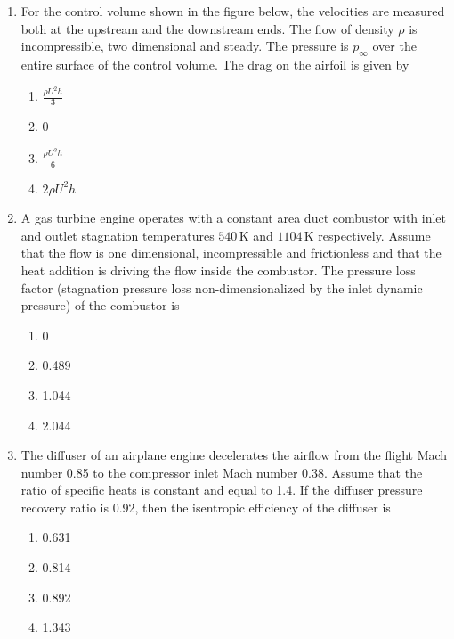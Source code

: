 \documentclass{article}
\begin{document}
\begin{enumerate}
    \item For the control volume shown in the figure below, the velocities are measured both at the upstream and the downstream ends. The flow of density $\rho$ is incompressible, two dimensional and steady. The pressure is $p_\infty$ over the entire surface of the control volume. The drag on the airfoil is given by
    \begin{figure}[H]
        \centering
        
        \caption{}
        \label{}
    \end{figure}
    \begin{enumerate}
        \item $\frac{\rho U^2 h}{3}$
        \item 0
        \item $\frac{\rho U^2 h}{6}$
        \item $2 \rho U^2 h$
    \end{enumerate}

    \item A gas turbine engine operates with a constant area duct combustor with inlet and outlet stagnation temperatures $540 \, \mathrm{K}$ and $1104 \, \mathrm{K}$ respectively. Assume that the flow is one dimensional, incompressible and frictionless and that the heat addition is driving the flow inside the combustor. The pressure loss factor (stagnation pressure loss non-dimensionalized by the inlet dynamic pressure) of the combustor is
    \begin{multicols}{4}
    \begin{enumerate}
        \item 0
        \item 0.489
        \item 1.044
        \item 2.044
    \end{enumerate}
    \end{multicols}
    

    \item The diffuser of an airplane engine decelerates the airflow from the flight Mach number 0.85 to the compressor inlet Mach number 0.38. Assume that the ratio of specific heats is constant and equal to 1.4. If the diffuser pressure recovery ratio is 0.92, then the isentropic efficiency of the diffuser is
    \begin{multicols}{4}
    \begin{enumerate}
        \item 0.631
        \item 0.814
        \item 0.892
        \item 1.343
    \end{enumerate}
    \end{multicols}
    


\end{enumerate}
\end{document}
